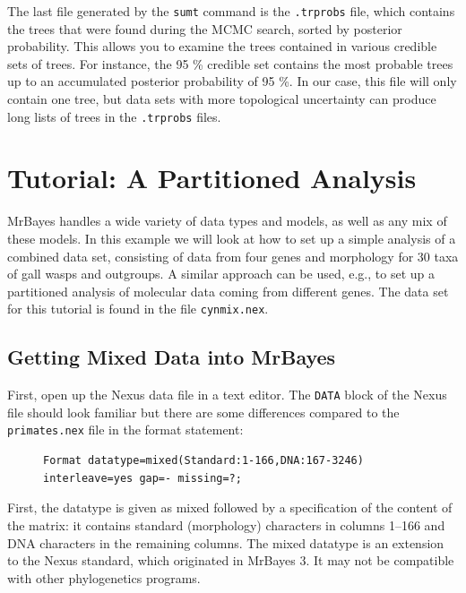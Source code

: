 \documentclass[12pt]{book}
\begin{document}
The last file generated by the \texttt{sumt} command is the \texttt{.trprobs} file, which contains
the trees that were found during the MCMC search, sorted by posterior probability. This allows you
to examine the trees contained in various credible sets of trees. For instance, the 95 \% credible
set contains the most probable trees up to an accumulated posterior probability of 95 \%. In our
case, this file will only contain one tree, but data sets with more topological uncertainty can
produce long lists of trees in the \texttt{.trprobs} files.

\chapter{Tutorial: A Partitioned Analysis}\label{tutorialPartitioned}

MrBayes handles a wide variety of data types and models, as well as any mix of these models. In
this example we will look at how to set up a simple analysis of a combined data set, consisting of
data from four genes and morphology for 30 taxa of gall wasps and outgroups. A similar approach can
be used, e.g., to set up a partitioned analysis of molecular data coming from different genes. The
data set for this tutorial is found in the file \texttt{cynmix.nex}. 

\section{Getting Mixed Data into MrBayes}

First, open up the Nexus data file in a text editor. The \texttt{DATA} block of the Nexus file
should look familiar but there are some differences compared to the \texttt{primates.nex} file in
the format statement:

\begin{figure}[h]
\begin{BVerbatim}
Format datatype=mixed(Standard:1-166,DNA:167-3246) interleave=yes gap=- missing=?;
\end{BVerbatim}
\end{figure}

First, the datatype is given as mixed followed by a specification of the content of the matrix: it
contains standard (morphology) characters in columns 1--166 and DNA characters in the remaining
columns. The mixed datatype is an extension to the Nexus standard, which originated in MrBayes 3.
It may not be compatible with other phylogenetics programs.
\end{document}
